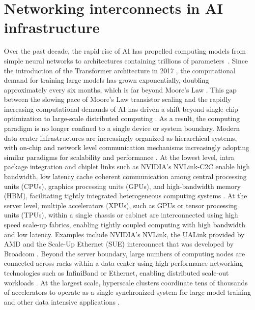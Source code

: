 \section{Networking interconnects in AI infrastructure} \label{sec:background}
Over the past decade, the rapid rise of AI has propelled computing models from simple neural networks to architectures containing trillions of parameters~\cite{Lu02012019, tu2024overview}.
Since the introduction of the Transformer architecture in 2017 \cite{transformer}, the computational demand for training large models has grown exponentially, doubling approximately every six months, which is far beyond Moore's Law \cite{9891914, 7878935}.
This gap between the slowing pace of Moore's Law transistor scaling and the rapidly increasing computational demands of AI has driven a shift beyond single chip optimization to large-scale distributed computing \cite{distributedcomputing}.
As a result, the computing paradigm is no longer confined to a single device or system boundary.
Modern data center infrastructures are increasingly organized as hierarchical systems, with on-chip and network level communication mechanisms increasingly adopting similar paradigms for scalability and performance \cite{noc, jerger2022chip, kas2012toward}.
At the lowest level, intra package integration and chiplet links such as NVIDIA's NVLink-C2C enable high bandwidth, low latency cache coherent communication among central processing units (CPUs), graphics processing units (GPUs), and high-bandwidth memory (HBM), facilitating tightly integrated heterogeneous computing systems \cite{10767590, chiplet, nvc2c}.
At the server level, multiple accelerators (XPUs), such as GPUs or tensor processing units (TPUs), within a single chassis or cabinet are interconnected using high speed scale-up fabrics, enabling tightly coupled computing with high bandwidth and low latency.
Examples include NVIDIA's NVLink, the UALink provided by AMD and the Scale-Up Ethernet (SUE) interconnect that was developed by Broadcom \cite{nvidia_nvlink, ualink_consortium, velaga2025sue}.
Beyond the server boundary, large numbers of computing nodes are connected across racks within a data center using high performance networking technologies such as InfiniBand or Ethernet, enabling distributed scale-out workloads \cite{pfister2001introduction, aramide2024ultra}.
At the largest scale, hyperscale clusters coordinate tens of thousands of accelerators to operate as a single synchronized system for large model training and other data intensive applications \cite{kokolis2025revisiting, broadcom_scale_across_ai}.
